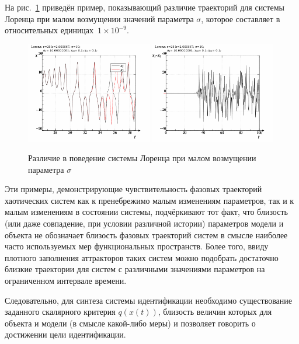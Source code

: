 На рис.~\ref{atu:f:lor_diff_sigma} приведён пример, показывающий
различие траекторий для системы Лоренца
при малом возмущении значений параметра $\sigma$,
которое составляет в относительных единицах~$1 \times 10^{-9}$.

\begin{figure}[h!]
  \centerline{
    \includegraphics[width=0.49\textwidth]{p/lor_diff-p_xx_sigma.png}
    \hfill
    \includegraphics[width=0.49\textwidth]{p/lor_diff-p_dx_sigma.png}
  }
  \caption{Различие в поведение системы Лоренца при малом возмущении параметра $\sigma$}
  \label{atu:f:lor_diff_sigma}
\end{figure}

Эти примеры, демонстрирующие чувствительность фазовых траекторий хаотических систем
как к пренебрежимо малым изменениям параметров, так и к малым изменениям
в состоянии системы, подчёркивают тот факт, что близость
(или даже совпадение, при условии различной истории) параметров модели
и объекта не обозначает близость фазовых траекторий систем
в смысле наиболее часто используемых мер функциональных пространств.
Более того, ввиду плотного заполнения аттракторов таких систем
можно подобрать достаточно близкие траектории для систем с различными значениями параметров
на ограниченном интервале времени.


Следовательно, для синтеза системы идентификации необходимо существование
заданного скалярного критерия $q(x(t))$, близость величин
которых для объекта и модели (в смысле какой-либо меры)
и позволяет говорить о достижении цели идентификации.

